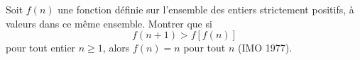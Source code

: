 Soit $f(n)$ une fonction définie sur l'ensemble des entiers strictement positifs, à valeurs dans ce même ensemble. Montrer que si
\[ f(n + 1) > f[f(n)] \]
pour tout entier $n \geq 1$, alors $f(n) = n$ pour tout $n$ (IMO 1977).
